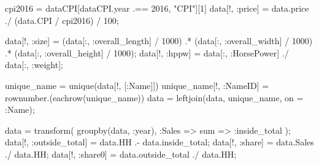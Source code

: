\documentclass[
  letterpaper,
  DIV=11,
  numbers=noendperiod]{scrreprt}
\newenvironment{Shaded}{\begin{snugshade}}{\end{snugshade}}
\newcommand{\FloatTok}[1]{\textcolor[rgb]{0.68,0.00,0.00}{#1}}
\newcommand{\FunctionTok}[1]{\textcolor[rgb]{0.28,0.35,0.67}{#1}}
\newcommand{\NormalTok}[1]{\textcolor[rgb]{0.00,0.23,0.31}{#1}}
\newcommand{\OperatorTok}[1]{\textcolor[rgb]{0.37,0.37,0.37}{#1}}
\newcommand{\StringTok}[1]{\textcolor[rgb]{0.13,0.47,0.30}{#1}}
\begin{document}
\begin{Shaded}
\begin{Highlighting}[]
\NormalTok{cpi2016 }\OperatorTok{=}\NormalTok{ dataCPI[dataCPI.year }\OperatorTok{.==} \FloatTok{2016}\NormalTok{, }\StringTok{"CPI"}\NormalTok{][}\FloatTok{1}\NormalTok{]}
\NormalTok{data[!, }\OperatorTok{:}\NormalTok{price] }\OperatorTok{=}\NormalTok{ data.price }\OperatorTok{./}\NormalTok{ (data.CPI }\OperatorTok{/}\NormalTok{ cpi2016) }\OperatorTok{/} \FloatTok{100}\NormalTok{;}
\end{Highlighting}
\end{Shaded}

\begin{Shaded}
\begin{Highlighting}[]
\NormalTok{data[!, }\OperatorTok{:}\NormalTok{size] }\OperatorTok{=}\NormalTok{ (data[}\OperatorTok{:}\NormalTok{, }\OperatorTok{:}\NormalTok{overall\_length] }\OperatorTok{/} \FloatTok{1000}\NormalTok{) }\OperatorTok{.*}\NormalTok{ (data[}\OperatorTok{:}\NormalTok{, }\OperatorTok{:}\NormalTok{overall\_width] }\OperatorTok{/} \FloatTok{1000}\NormalTok{) }\OperatorTok{.*}\NormalTok{ (data[}\OperatorTok{:}\NormalTok{, }\OperatorTok{:}\NormalTok{overall\_height] }\OperatorTok{/} \FloatTok{1000}\NormalTok{);}
\NormalTok{data[!, }\OperatorTok{:}\NormalTok{hppw] }\OperatorTok{=}\NormalTok{ data[}\OperatorTok{:}\NormalTok{, }\OperatorTok{:}\NormalTok{HorsePower] }\OperatorTok{./}\NormalTok{ data[}\OperatorTok{:}\NormalTok{, }\OperatorTok{:}\NormalTok{weight];}

\NormalTok{unique\_name }\OperatorTok{=} \FunctionTok{unique}\NormalTok{(data[!, [}\OperatorTok{:}\NormalTok{Name]])}
\NormalTok{unique\_name[!, }\OperatorTok{:}\NormalTok{NameID] }\OperatorTok{=} \FunctionTok{rownumber}\NormalTok{.(}\FunctionTok{eachrow}\NormalTok{(unique\_name))}
\NormalTok{data }\OperatorTok{=} \FunctionTok{leftjoin}\NormalTok{(data, unique\_name, on }\OperatorTok{=} \OperatorTok{:}\NormalTok{Name);}

\NormalTok{data }\OperatorTok{=} \FunctionTok{transform}\NormalTok{(}
    \FunctionTok{groupby}\NormalTok{(data, }\OperatorTok{:}\NormalTok{year),}
    \OperatorTok{:}\NormalTok{Sales }\OperatorTok{=\textgreater{}}\NormalTok{ sum }\OperatorTok{=\textgreater{}} \OperatorTok{:}\NormalTok{inside\_total}
\NormalTok{);}
\NormalTok{data[!, }\OperatorTok{:}\NormalTok{outside\_total] }\OperatorTok{=}\NormalTok{ data.HH }\OperatorTok{.{-}}\NormalTok{ data.inside\_total;}
\NormalTok{data[!, }\OperatorTok{:}\NormalTok{share] }\OperatorTok{=}\NormalTok{ data.Sales }\OperatorTok{./}\NormalTok{ data.HH;}
\NormalTok{data[!, }\OperatorTok{:}\NormalTok{share0] }\OperatorTok{=}\NormalTok{ data.outside\_total }\OperatorTok{./}\NormalTok{ data.HH;}
\end{Highlighting}
\end{Shaded}
\end{document}
